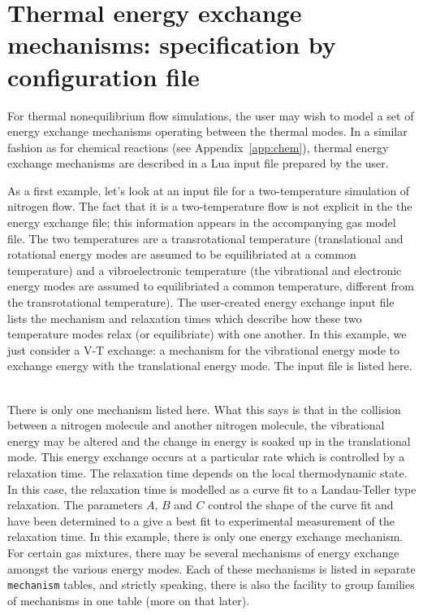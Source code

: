 \section{Thermal energy exchange mechanisms: specification by configuration file}
\label{app:therm-exchange}
For thermal nonequilibrium flow simulations, the user may wish to model a set of 
energy exchange mechanisms operating between the thermal modes.
In a similar fashion as for chemical reactions (see Appendix~\ref{app:chem}), 
thermal energy exchange mechanisms are described in a Lua input file prepared by
the user.

As a first example, let's look at an input file for a two-temperature
simulation of nitrogen flow.
The fact that it is a two-temperature flow is not explicit in the
the energy exchange file; this information appears in the accompanying
gas model file.
The two temperatures are a transrotational temperature (translational and
rotational energy modes are assumed to be equilibriated at a common temperature)
and a vibroelectronic temperature (the vibrational and electronic energy modes
are assumed to equilibriated a common temperature, different from the transrotational
temperature).
The user-created energy exchange input file lists the mechanism and relaxation times
which describe how these two temperature modes relax (or equilibriate) with one another.
In this example, we just consider a V-T exchange: a mechanism for the vibrational
energy mode to exchange energy with the translational energy mode.
The input file is listed here.\\
\topbar

\bottombar\\
There is only one mechanism listed here.
What this says is that in the collision between a nitrogen molecule
and another nitrogen molecule, the vibrational energy may be altered and
the change in energy is soaked up in the translational mode.
This energy exchange occurs at a particular rate which is controlled
by a relaxation time.
The relaxation time depends on the local thermodynamic state.
In this case, the relaxation time is modelled as a curve fit to a
Landau-Teller type relaxation.
The parameters $A$, $B$ and $C$ control the shape of the curve fit and
have been determined to a give a best fit to experimental measurement
of the relaxation time.
In this example, there is only one energy exchange mechanism.
For certain gas mixtures, there may be several mechanisms of energy exchange
amongst the various energy modes.
Each of these mechanisms is listed in separate \texttt{mechanism} tables,
and strictly speaking, there is also the facility to group families
of mechanisms in one table (more on that later).

